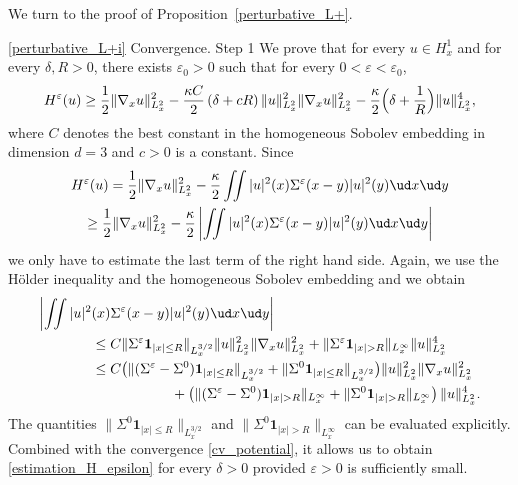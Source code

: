 We turn to the proof of Proposition~\ref{perturbative_L+}.

\begin{ProofOf}{\eqref{perturbative_L+i} Convergence. Step 1}
We prove that for every $u\in H_{x}^{1}$ and for every $\delta, R>0$, there exists $\varepsilon_{0}>0$ such that for every $0<\varepsilon<\varepsilon_{0}$,
\begin{equation}\label{estimation_H_epsilon}
H^{\varepsilon}(u)\geq\frac{1}{2}\|\nabla_{x}u\|_{L_{x}^{2}}^{2}-\frac{\kappa C}{2}\left(\delta+cR\right)\|u\|_{L_{x}^{2}}^{2}\|\nabla_{x}u\|_{L_{x}^{2}}^{2}-\frac{\kappa}{2}\Bigl(\delta+\frac{1}{R}\Bigr)\|u\|_{L_{x}^{2}}^{4},
\end{equation}
where $C$ denotes the best constant in the homogeneous Sobolev embedding in dimension $d=3$ and $c>0$ is a constant. Since
\begin{multline*}
H^{\varepsilon}(u)=\frac{1}{2}\|\nabla_{x}u\|_{L_{x}^{2}}^{2}-\frac{\kappa}{2}\iint|u|^{2}(x)\Sigma^{\varepsilon}(x-y)|u|^{2}(y)\ud x\ud y\\
\geq\frac{1}{2}\|\nabla_{x}u\|_{L_{x}^{2}}^{2}-\frac{\kappa}{2}\left|\iint|u|^{2}(x)\Sigma^{\varepsilon}(x-y)|u|^{2}(y)\ud x\ud y\right|
\end{multline*}
we only have to estimate the last term of the right hand side. Again, we use the Hölder inequality and the homogeneous Sobolev embedding and we obtain
\begin{align*}
\biggl|\iint|u|^{2}&(x)\Sigma^{\varepsilon}(x-y)|u|^{2}(y)\ud x\ud y\biggr|
\\
&\leq C\|\Sigma^{\varepsilon}\mathbf{1}_{|x|\leq R}\|_{L_{x}^{3/2}}\|u\|_{L_{x}^{2}}^{2}\|\nabla_{x}u\|_{L_{x}^{2}}^{2}+\|\Sigma^{\varepsilon}\mathbf{1}_{|x|>R}\|_{L_{x}^{\infty}}\|u\|_{L_{x}^{2}}^{4}\\
&\leq C\bigl(\|(\Sigma^{\varepsilon}-\Sigma^{0})\mathbf{1}_{|x|\leq R}\|_{L_{x}^{3/2}}+\|\Sigma^{0}\mathbf{1}_{|x|\leq R}\|_{L_{x}^{3/2}}\bigr)\|u\|_{L_{x}^{2}}^{2}\|\nabla_{x}u\|_{L_{x}^{2}}^{2}\\
&\hspace*{2cm}+\left(\|(\Sigma^{\varepsilon}-\Sigma^{0})\mathbf{1}_{|x|>R}\|_{L_{x}^{\infty}}+\|\Sigma^{0}\mathbf{1}_{|x|>R}\|_{L_{x}^{\infty}}\right)\|u\|_{L_{x}^{2}}^{4}.
\end{align*}
The quantities $\|\Sigma^{0}\mathbf{1}_{|x|\leq R}\|_{L_{x}^{3/2}}$ and $\|\Sigma^{0}\mathbf{1}_{|x|>R}\|_{L_{x}^{\infty}}$ can be evaluated
explicitly. Combined with the convergence \eqref{cv_potential}, it allows us to obtain \eqref{estimation_H_epsilon} for every $\delta>0$ provided $\varepsilon>0$ is sufficiently small.


\end{ProofOf}
